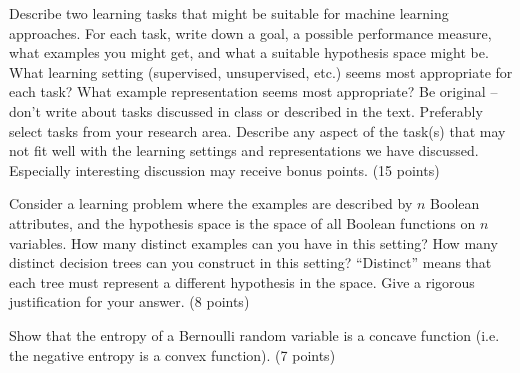 \documentclass[fleqn]{homework}
\begin{document}
  \begin{problem}{3}
    \begin{question}
      Describe two learning tasks that might be suitable for machine learning
      approaches.  For each task, write down a goal, a possible performance
      measure, what examples you might get, and what a suitable hypothesis space
      might be.  What learning setting (supervised, unsupervised, etc.) seems
      most appropriate for each task?  What example representation seems most
      appropriate?  Be original -- don't write about tasks discussed in class or
      described in the text.  Preferably select tasks from your research area.
      Describe any aspect of the task(s) that may not fit well with the learning
      settings and representations we have discussed.  Especially interesting
      discussion may receive bonus points. (15 points)
    \end{question}
  \end{problem}

  \begin{problem}{4}
    \begin{question}
      Consider a learning problem where the examples are described by $n$
      Boolean attributes, and the hypothesis space is the space of all Boolean
      functions on $n$ variables.  How many distinct examples can you have in
      this setting?  How many distinct decision trees can you construct in this
      setting?  ``Distinct'' means that each tree must represent a different
      hypothesis in the space.  Give a rigorous justification for your
      answer. (8 points)
    \end{question}
  \end{problem}

  \begin{problem}{5}
    \begin{question}
      Show that the entropy of a Bernoulli random variable is a concave function
      (i.e. the negative entropy is a convex function). (7 points)
    \end{question}
  \end{problem}
\end{document}
